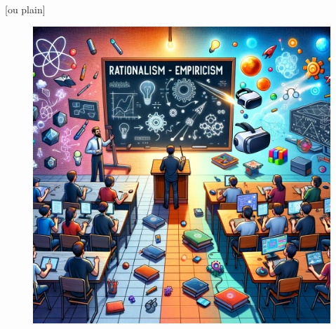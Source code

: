 \documentclass[aspectratio=169]{beamer}
\begin{document}
[ou plain]
\begin{frame}
\begin{figure}
    \centering
    \vspace{-1cm}
    \hspace*{-1.2cm}\includegraphics[width=1.2\linewidth]{images/plaatje.png}
\end{figure}
\end{frame}

\end{document}
